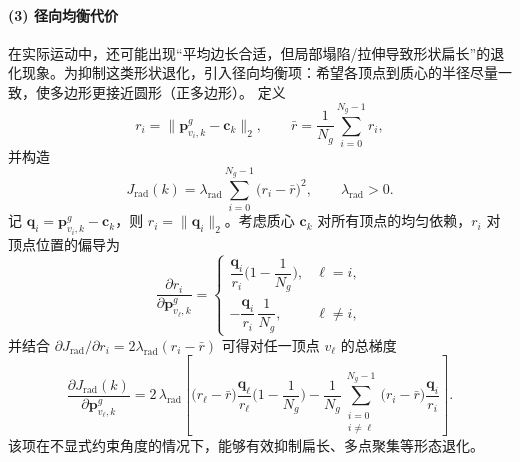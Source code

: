 \paragraph{(3) 径向均衡代价}
在实际运动中，还可能出现“平均边长合适，但局部塌陷/拉伸导致形状扁长”的退化现象。为抑制这类形状退化，引入径向均衡项：希望各顶点到质心的半径尽量一致，使多边形更接近圆形（正多边形）。
定义
\begin{equation}
\label{eq:radial_def}
r_i=\big\|\mathbf{p}^{g}_{v_i,k}-\mathbf{c}_k\big\|_2,\qquad 
\bar r=\frac{1}{N_g}\sum_{i=0}^{N_g-1}r_i,
\end{equation}
并构造
\begin{equation}
\label{eq:J_radial}
J_{\mathrm{rad}}(k)=\lambda_{\mathrm{rad}}\sum_{i=0}^{N_g-1}\big(r_i-\bar r\big)^2,\qquad \lambda_{\mathrm{rad}}>0.
\end{equation}
记 \(\mathbf{q}_i=\mathbf{p}^{g}_{v_i,k}-\mathbf{c}_k\)，则 \(r_i=\|\mathbf{q}_i\|_2\)。考虑质心 \(\mathbf{c}_k\) 对所有顶点的均匀依赖，\(r_i\) 对顶点位置的偏导为
\begin{equation}
\label{eq:dr_i_dpos}
\frac{\partial r_i}{\partial \mathbf{p}^{g}_{v_\ell,k}}=
\begin{cases}
\dfrac{\mathbf{q}_i}{r_i}\Big(1-\dfrac{1}{N_g}\Big), & \ell=i,\\[6pt]
-\dfrac{\mathbf{q}_i}{r_i}\,\dfrac{1}{N_g}, & \ell\neq i,
\end{cases}
\end{equation}
并结合 \(\partial J_{\mathrm{rad}}/\partial r_i=2\lambda_{\mathrm{rad}}(r_i-\bar r)\) 可得对任一顶点 \(v_\ell\) 的总梯度
\begin{equation}
\label{eq:J_radial_grad_pos}
\frac{\partial J_{\mathrm{rad}}(k)}{\partial \mathbf{p}^{g}_{v_\ell,k}}
=2\,\lambda_{\mathrm{rad}}\left[
\big(r_\ell-\bar r\big)\frac{\mathbf{q}_\ell}{r_\ell}\Big(1-\frac{1}{N_g}\Big)
-\frac{1}{N_g}\sum_{\substack{i=0\\ i\neq \ell}}^{N_g-1}
\big(r_i-\bar r\big)\frac{\mathbf{q}_i}{r_i}
\right].
\end{equation}
该项在不显式约束角度的情况下，能够有效抑制扁长、多点聚集等形态退化。

